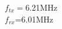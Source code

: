\documentclass[preview]{standalone}
\begin{document}
\begin{center}
$f_{tx}=$6.21MHz\\$f_{rx}$=6.01MHz
\end{center}
\end{document}
